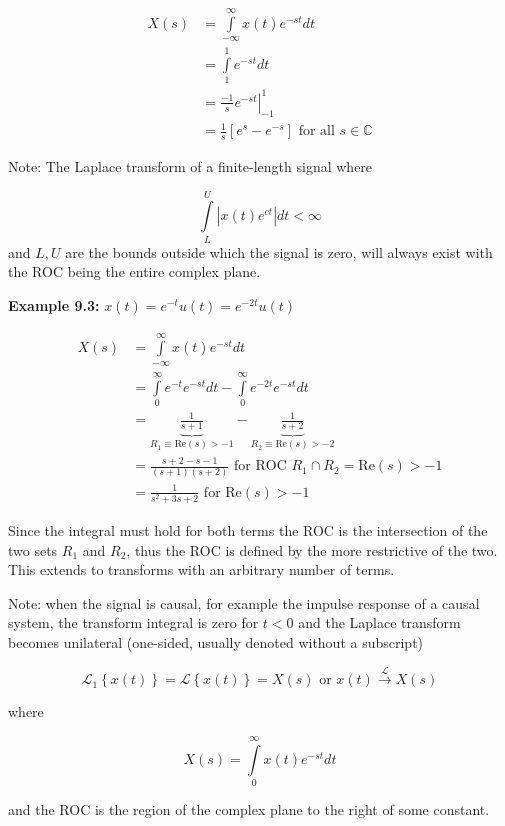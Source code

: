 \documentclass{article}
\begin{document}
\begin{align}
  X(s) &= \int\limits_{-\infty}^{\infty} x(t) e^{-st} dt\\
  &= \int\limits_{1}^{1} e^{-st} dt\\
  &= \left. \frac{-1}{s} e^{-st} \right|_{-1}^{1}\\
  &= \frac{1}{s} \left[e^{s} - e^{-s} \right] \text{ for all } s \in\mathbb{C}
\end{align}

Note: The Laplace transform of a finite-length signal where

\[
\int\limits_{L}^{U}\left| x(t)e^{ct} \right| dt < \infty
\]
and $L,U$ are the bounds outside which the signal is zero, will always exist with the ROC being the entire complex plane.

\textbf{Example 9.3:} $x(t) = e^{-t}u(t) = e^{-2t}u(t)$

\begin{align}
  X(s) &= \int\limits_{-\infty}^{\infty} x(t) e^{-st} dt\\
  &= \int\limits_{0}^{\infty} e^{-t} e^{-st} dt - \int\limits_{0}^{\infty} e^{-2t} e^{-st} dt\\
  &= \underbrace{\frac{1}{s+1}}_{R_1 \equiv \text{Re}(s) > -1} - \underbrace{\frac{1}{s+2}}_{R_2 \equiv \text{Re}(s) > -2}\\
  &= \frac{s+2 - s - 1}{(s+1)(s+2)} \text{ for ROC } R_1 \cap R_2 = \text{Re}(s) > -1\\
  &= \frac{1}{s^2 + 3s + 2} \text{ for } \text{Re}(s) > -1
\end{align}

Since the integral must hold for both terms the ROC is the intersection of the two sets $R_1$ and $R_2$, thus the ROC is defined by the more restrictive of the two. This extends to transforms with an arbitrary number of terms.

Note: when the signal is causal, for example the impulse response of a causal system, the transform integral is zero for $t < 0$ and the Laplace transform becomes unilateral (one-sided, usually denoted without a subscript)

\[
\mathcal{L}_1\left\{ x(t) \right\} = \mathcal{L}\left\{ x(t) \right\} = X(s) \text{ or } x(t) \stackrel{\mathcal{L}}{\longrightarrow} X(s)
\]

where

\[
X(s) = \int\limits_{0}^{\infty} x(t) e^{-st} dt
\]

and the ROC is the region of the complex plane to the right of some constant.
\end{document}
